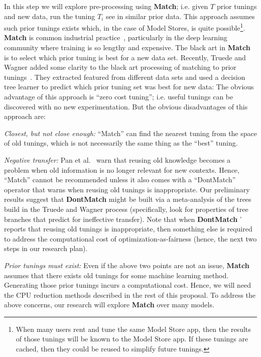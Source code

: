  In this step we will
explore pre-processing using   {\bf Match}; i.e.   given $T$ prior tunings and  new data,  run the tuning $T_i$  see in similar prior data.
This approach assumes such prior tunings exists which, in the case
of Model Stores, is quite possible\footnote{When many users
rent and tune the same Model Store app, then the results of 
those tunings will be known to the Model Store app. If these tunings
are cached, then
they could be reused to simplify future tunings.}.
{\bf Match} is common industrial practice~\cite{dlreuse}, particularly
in the deep learning community where training is so lengthy and 
expensive. The black art in {\bf Match} is to select which prior
tuning is best for a new data set. Recently,   Truede and Wagner   added
  some clarity to the black art
  processing of matching to prior tunings~\cite{treude2018per}. They extracted featured from different data sets and used a decision tree learner to predict which prior tuning set
was best for new data:
The obvious advantage of this approach is ``zero cost tuning''; i.e. 
useful tunings can be discovered with no new experimentation. But the
 obvious disadvantages of this approach are:
\bi
\item {\em Closest, but not close enough:} ``Match'' can find the nearest
tuning from the space of old tunings, which is not necessarily
the same thing as the ``best'' tuning. 

\item {\em Negative transfer:} Pan et al.~\cite{Pan2010A}
warn that reusing old knowledge becomes
a problem when old information is no longer relevant for new contexts.
Hence, ``Match'' cannot be recommended unless it also comes with a 
``DontMatch'' operator that warns when reusing old tunings is inappropriate.
Our preliminary results suggest that {\bf DontMatch} might be
built via a meta-analysis of the trees build in the Truede and Wagner 
process (specifically,  look for properties of tree branches that predict for
ineffective transfer).  Note that when {\bf DontMatch} ' reports that 
reusing old tunings is inappropriate, then something else is required
to address the computational cost of optimization-as-fairness
(hence, the next two steps in our research plan).
\item {\em Prior tunings must exist:} Even if the above two points are
not an issue, {\bf Match}  assumes that there exists
old tunings  
for some machine learning method.
Generating those prior tunings incurs a computational cost.
Hence, we will need the CPU reduction methods described in the rest of this proposal.
\ei
To address the above concerns, our research will explore {\bf Match} 
over many models. 

